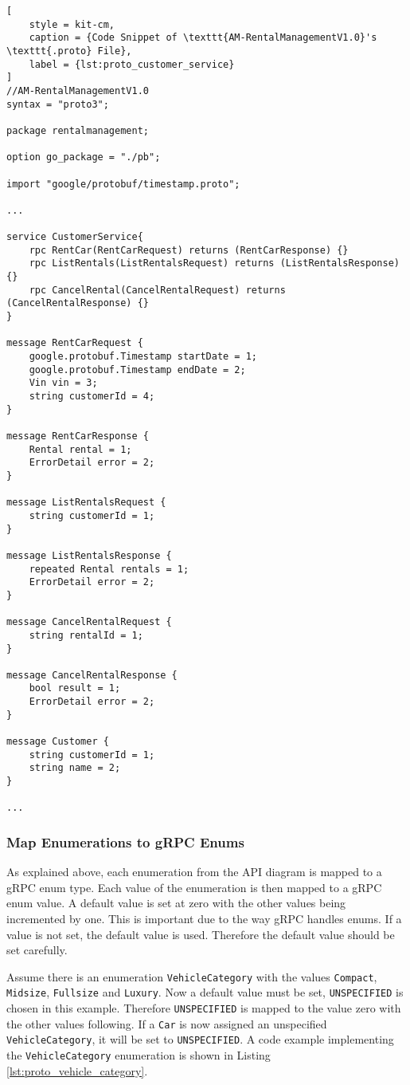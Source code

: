 \begin{lstlisting}[
    style = kit-cm,
    caption = {Code Snippet of \texttt{AM-RentalManagementV1.0}'s \texttt{.proto} File},
    label = {lst:proto_customer_service}
]
//AM-RentalManagementV1.0
syntax = "proto3";

package rentalmanagement;

option go_package = "./pb";

import "google/protobuf/timestamp.proto";

...

service CustomerService{
    rpc RentCar(RentCarRequest) returns (RentCarResponse) {}
    rpc ListRentals(ListRentalsRequest) returns (ListRentalsResponse) {}
    rpc CancelRental(CancelRentalRequest) returns (CancelRentalResponse) {}
}

message RentCarRequest {
    google.protobuf.Timestamp startDate = 1;
    google.protobuf.Timestamp endDate = 2;
    Vin vin = 3;
    string customerId = 4;
}

message RentCarResponse {
    Rental rental = 1;
    ErrorDetail error = 2;
}

message ListRentalsRequest {
    string customerId = 1;
}

message ListRentalsResponse {
    repeated Rental rentals = 1;
    ErrorDetail error = 2;
}

message CancelRentalRequest {
    string rentalId = 1;
}

message CancelRentalResponse {
    bool result = 1;
    ErrorDetail error = 2;
}

message Customer {
    string customerId = 1;
    string name = 2;
}

...
\end{lstlisting}
\subsubsection*{Map Enumerations to gRPC Enums}
As explained above, each enumeration from the API diagram is mapped to a gRPC enum type.
Each value of the enumeration is then mapped to a gRPC enum value.
A default value is set at zero with the other values being incremented by one.
This is important due to the way gRPC handles enums.
If a value is not set, the default value is used.
Therefore the default value should be set carefully.

Assume there is an enumeration \texttt{VehicleCategory} with the values \texttt{Compact}, \texttt{Midsize}, \texttt{Fullsize} and \texttt{Luxury}.
Now a default value must be set, \texttt{UNSPECIFIED} is chosen in this example.
Therefore \texttt{UNSPECIFIED} is mapped to the value zero with the other values following.
If a \texttt{Car} is now assigned an unspecified \texttt{VehicleCategory}, it will be set to \texttt{UNSPECIFIED}.
A code example implementing the \texttt{VehicleCategory} enumeration is shown in Listing \autoref{lst:proto_vehicle_category}.

